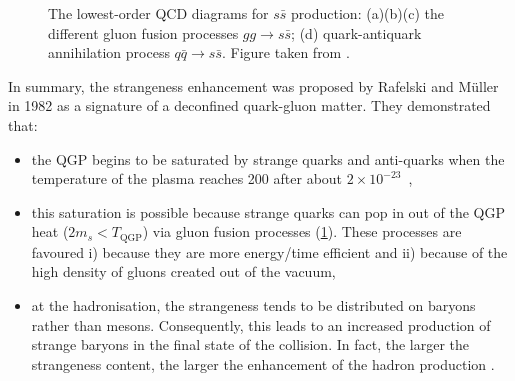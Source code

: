 \begin{figure}[h]
\begin{minipage}{0.33\textwidth}
	\end{minipage}\par\medskip
	\centering
	\begin{minipage}{0.33\textwidth}
	\end{minipage}%
	\caption{The lowest-order QCD diagrams for $s\bar{s}$ production: (a)(b)(c) the
	 different gluon fusion processes $gg\rightarrow s\bar{s}$; (d) quark-antiquark annihilation process $q\bar{q} \rightarrow s\bar{s}$. Figure taken from \cite{maireProductionBaryonsMultietranges2011}.}
	\label{fig:StrangenessEnhancement}
\end{figure}



In summary, the strangeness enhancement was proposed by Rafelski and M\"{u}ller in 1982 as a signature of a deconfined quark-gluon matter. They demonstrated that:
\begin{itemize}
\item the QGP begins to be saturated by strange quarks and anti-quarks when the temperature of the plasma reaches 200 \mev after about $2 \times 10^{-23}$~\second,
\item this saturation is possible because strange quarks can pop in out of the QGP heat ($2 m_{s} < T_{\textrm{QGP}}$) via gluon fusion processes (\fig\ref{fig:StrangenessEnhancement}). These processes are favoured i) because they are more energy/time efficient and ii) because of the high density of gluons created out of the vacuum,
\item at the hadronisation, the strangeness tends to be distributed on baryons rather than mesons. Consequently, this leads to an increased production of strange baryons in the final state of the collision. In fact, the larger the strangeness content, the larger the enhancement of the hadron production \cite{rafelskiMeltingHadronsBoiling2015}.\\
\end{itemize}

